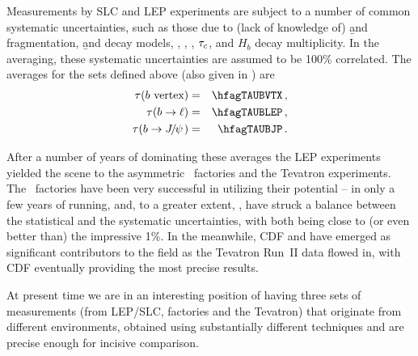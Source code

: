 Measurements by SLC and LEP experiments are subject to a number of
common systematic uncertainties, such as those due to (lack of knowledge
of) \b and  fragmentation, \b and  decay models,
, , , $\tau_{c}$,
and $H_b$ decay multiplicity.  In the averaging, these systematic
uncertainties are assumed to be 100\% correlated.  The averages for the
sets defined above (also given in ) are
\begin{eqnarray}
\tau(\b~\mbox{vertex}) &=& \hfagTAUBVTX \,, \labe{TAUBVTX} \\
\tau(\b\to\ell) &=& \hfagTAUBLEP  \,, \\
\tau(\b\to\particle{\jpsi}) &=& \hfagTAUBJP\,.
\end{eqnarray}



After a number of years of dominating these averages the LEP experiments
yielded the scene to the asymmetric \B~factories and
the Tevatron experiments. The \B~factories have been very successful in
utilizing their potential -- in only a few years of running, \babar and,
to a greater extent, \belle, have struck a balance between the
statistical and the systematic uncertainties, with both being close to
(or even better than) the impressive 1\%.  In the meanwhile, CDF and
\dzero have emerged as significant contributors to the field as the
Tevatron Run~II data flowed in, with CDF eventually providing the most precise results. 


At present time we are in an interesting position of having three sets
of measurements (from LEP/SLC, \B factories and the Tevatron) that
originate from different environments, obtained using substantially
different techniques and are precise enough for incisive comparison.


